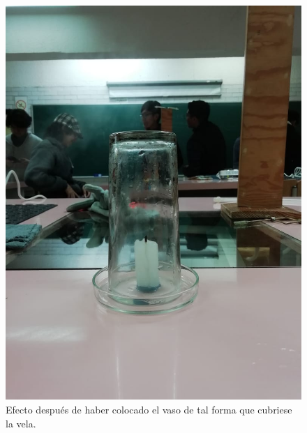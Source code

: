 \documentclass[10pt,a4paper]{article}
\begin{document}
\begin{figure}[H]
\includegraphics[scale=0.2]{Efectovela.jpeg}
\centering
\caption{Efecto después de haber colocado el vaso de tal forma que cubriese la vela.}
\end{figure}
\end{document}
